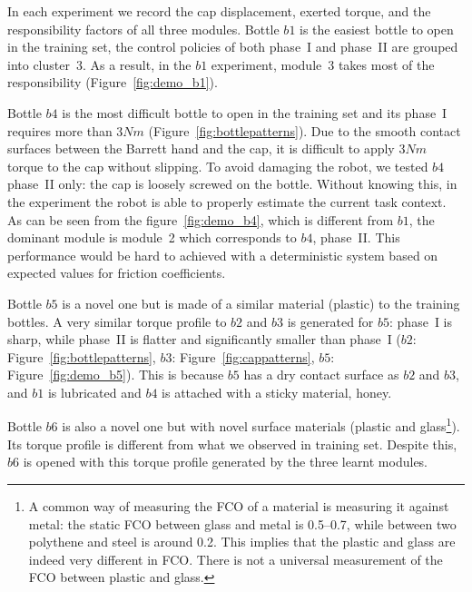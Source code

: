 In each experiment we record the cap displacement, exerted torque, and
the responsibility factors of all three modules. Bottle $b1$ is the
easiest bottle to open in the training set, the control policies of
both phase~I and phase~II are grouped into cluster~3. As a result,
in the $b1$ experiment, module~3 takes most of the responsibility
(Figure~\ref{fig:demo_b1}).

Bottle $b4$ is the most difficult bottle to open in the training set
and its phase~I requires more than $3Nm$
(Figure~\ref{fig:bottlepatterns}). Due to the smooth contact surfaces
between the Barrett hand and the cap, it is difficult to apply $3Nm$
torque to the cap without slipping. To avoid damaging the robot, we
tested $b4$ phase~II only: the cap is loosely screwed on the
bottle. Without knowing this, in the experiment the robot is able to
properly estimate the current task context. As can be seen from the
figure~\ref{fig:demo_b4}, which is different from $b1$, the dominant
module is module~2 which corresponds to  $b4$, phase~II. This
performance would be hard to achieved with a deterministic system based
on expected values for friction coefficients.

Bottle $b5$ is a novel one but is made of a similar material (plastic) to
the training bottles. A very similar torque profile to $b2$ and $b3$ is
generated for $b5$: phase~I is sharp, while phase~II is flatter and
significantly smaller than phase~I ($b2$:
Figure~\ref{fig:bottlepatterns}, $b3$: Figure~\ref{fig:cappatterns},
$b5$: Figure~\ref{fig:demo_b5}). This is because $b5$ has a dry contact
surface as $b2$ and $b3$, and $b1$ is lubricated and $b4$ is attached with
a sticky material, honey.

Bottle $b6$ is also a novel one but with novel surface materials
(plastic and glass\footnote{A common way of measuring the FCO of a
  material is measuring it against metal: the static FCO between glass
  and metal is 0.5--0.7, while between two polythene and steel is
  around 0.2. This implies that the plastic and glass are indeed very
  different in FCO. There is not a universal measurement of the FCO
  between plastic and glass.}). Its torque profile is different from
what we observed in training set. Despite this, $b6$ is opened with this
torque profile generated by the three learnt modules.

